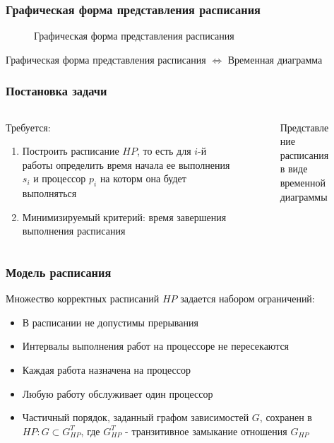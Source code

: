 \begin{frame}
    \frametitle{Графическая форма представления расписания}
    \begin{figure}
        \small
        \captionsetup{labelformat=empty}
        \caption{\small Графическая форма представления расписания}
    \end{figure}
    Графическая форма представления расписания $\Leftrightarrow$ Временная диаграмма
\end{frame}

\begin{frame}
    \frametitle{Постановка задачи}
    \begin{columns}
        \begin{column}{0.7\textwidth}
            Требуется:
            \begin{enumerate}
                \item Построить расписание $HP$, то есть для $i$-й работы определить время начала ее выполнения $s_i$ и процессор $p_i$ на которм она будет выполняться
                \item Минимизируемый критерий: время завершения выполнения расписания
            \end{enumerate}
        \end{column}
        \begin{column}{0.3\textwidth}
            \begin{figure}
                \tiny
                \captionsetup{labelformat=empty}
                \caption{\small Представление расписания в виде временной диаграммы}
            \end{figure}
        \end{column}
    \end{columns}
\end{frame}

\begin{frame}
    \frametitle{Модель расписания}
    Множество корректных расписаний $HP$ задается набором ограничений:
    \begin{itemize}
        \item В расписании не допустимы прерывания
        \item Интервалы выполнения работ на процессоре не пересекаются
        \item Каждая работа назначена на процессор
        \item Любую работу обслуживает один процессор
        \item Частичный порядок, заданный графом зависимостей $G$, сохранен в $HP: G \subset G_{HP}^T$, где $G_{HP}^T$ - транзитивное замыкание отношения $G_{HP}$
    \end{itemize}
\end{frame}

